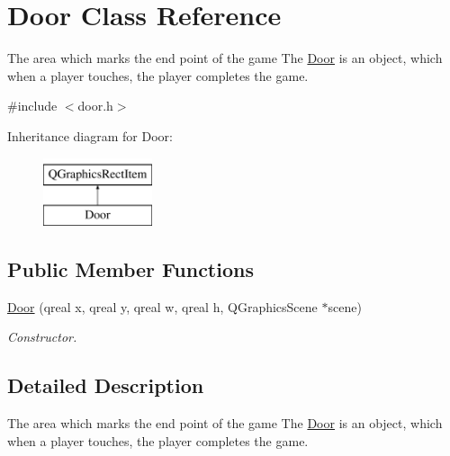 \hypertarget{classDoor}{\section{Door Class Reference}
\label{classDoor}
}


The area which marks the end point of the game The \hyperlink{classDoor}{Door} is an object, which when a player touches, the player completes the game.  




{\ttfamily \#include $<$door.\-h$>$}

Inheritance diagram for Door\-:\begin{figure}[H]
\begin{center}
\leavevmode
\includegraphics[height=2.000000cm]{classDoor}
\end{center}
\end{figure}
\subsection*{Public Member Functions}
\begin{DoxyCompactItemize}
\item 
\hyperlink{classDoor_a9a3828bd84f205da13c7591fafc29783}{Door} (qreal x, qreal y, qreal w, qreal h, Q\-Graphics\-Scene $\ast$scene)
\begin{DoxyCompactList}\small\item\em Constructor. \end{DoxyCompactList}\end{DoxyCompactItemize}


\subsection{Detailed Description}
The area which marks the end point of the game The \hyperlink{classDoor}{Door} is an object, which when a player touches, the player completes the game. 

